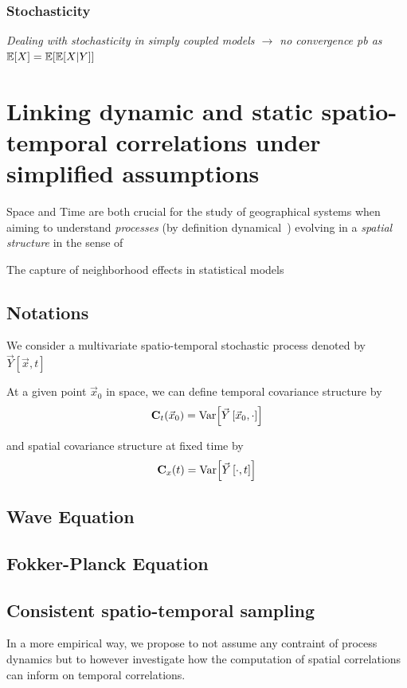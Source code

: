 \subsubsection{Stochasticity}

\textit{Dealing with stochasticity in simply coupled models $\rightarrow$ no convergence pb as $\operatorname{\mathbb{E}}\!\left[X\right]=\operatorname{\mathbb{E}}\!\left[\operatorname{\mathbb{E}}\!\left[X|Y\right]\right]$}














\newpage



\section[Spatio-temporal Correlations]{Linking dynamic and static spatio-temporal correlations under simplified assumptions}

\label{sec:spatiotempcorrs}

Space and Time are both crucial for the study of geographical systems when aiming to understand \emph{processes} (by definition dynamical~\cite{hypergeo}) evolving in a \emph{spatial structure} in the sense of~\cite{dollfus1975some}


The capture of neighborhood effects in statistical models 


\subsection{Notations}

We consider a multivariate spatio-temporal stochastic process denoted by $\vec{Y}\left[\vec{x},t\right]$

At a given point $\vec{x}_0$ in space, we can define temporal covariance structure by
\[
\mathbf{C}_t (\vec{x}_0) = \operatorname{Var}\!\left[\vec{Y}\left[\vec{x}_0, \cdot\right]\right]
\]

and spatial covariance structure at fixed time by
\[
\mathbf{C}_x (t) = \operatorname{Var}\!\left[\vec{Y}\left[\cdot, t\right]\right]
\]

\subsection{Wave Equation}




\subsection{Fokker-Planck Equation}




\subsection{Consistent spatio-temporal sampling}

In a more empirical way, we propose to not assume any contraint of process dynamics but to however investigate how the computation of spatial correlations can inform on temporal correlations.







